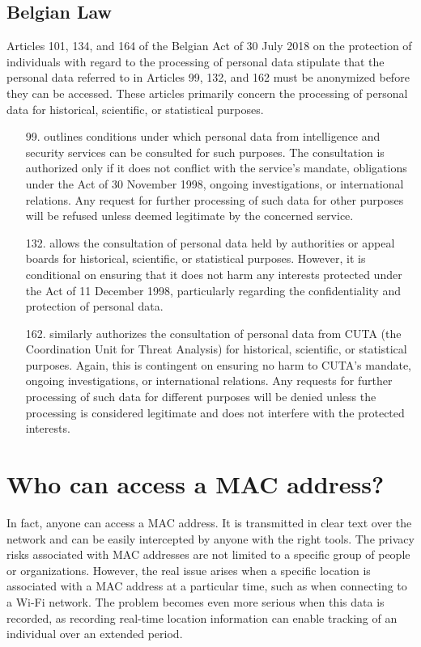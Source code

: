 \documentclass[aps,prb,twocolumn,superscriptaddress,floatfix,longbibliography,nofootinbib]{revtex4-2}
\begin{document}
  \subsection{\label{subsec:BEL}Belgian Law}

  Articles 101, 134, and 164 of the Belgian Act of 30 July 2018 on the protection
  of individuals with regard to the processing of personal data
  stipulate that the personal data referred to in
  Articles 99, 132, and 162 must be anonymized before they can be accessed. 
  These articles primarily concern the processing of personal data for historical, 
  scientific, or statistical purposes.

    \begin{enumerate}
    \item[99.] outlines conditions under which personal data from intelligence 
    and security services can be consulted for such purposes. The consultation 
    is authorized only if it does not conflict with the service’s mandate, obligations 
    under the Act of 30 November 1998, ongoing investigations, or international relations. 
    Any request for further processing of such data for other purposes will be refused 
    unless deemed legitimate by the concerned service.

    \item[132.] allows the consultation of personal data held by authorities or 
    appeal boards for historical, scientific, or statistical purposes. However, 
    it is conditional on ensuring that it does not harm any interests protected 
    under the Act of 11 December 1998, particularly regarding the confidentiality 
    and protection of personal data.

    \item[162.] similarly authorizes the consultation of personal data from CUTA 
    (the Coordination Unit for Threat Analysis) for historical, scientific, or 
    statistical purposes. Again, this is contingent on ensuring no harm to CUTA’s 
    mandate, ongoing investigations, or international relations. Any requests for 
    further processing of such data for different purposes will be denied unless 
    the processing is considered legitimate and does not interfere with the 
    protected interests.
    \end{enumerate}
  \cite{BelgianAct2018}

\section{\label{sec:Who}Who can access a MAC address?}
  In fact, anyone can access a MAC address. It is transmitted in clear text over 
  the network and can be easily intercepted by anyone with the right tools. The privacy risks associated
  with MAC addresses are not limited to a specific group of people or organizations.
  However, the real issue arises when a specific location is associated with a 
  MAC address at a particular time, such as when connecting to a Wi-Fi network. 
  The problem becomes even more serious when this data is recorded, as recording 
  real-time location information can enable tracking of an individual over an 
  extended period.
\end{document}
